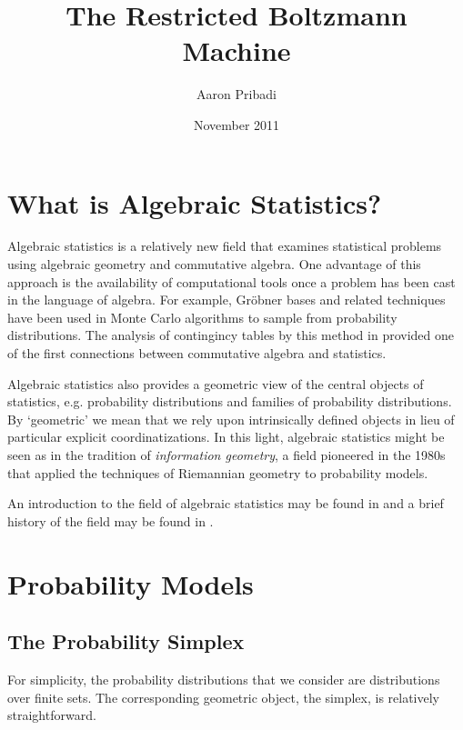 \documentclass[11pt,titlepage]{article}
\title{The Restricted Boltzmann Machine}
\author{Aaron Pribadi}
\date{November 2011}
\begin{document}
\maketitle

\tableofcontents

\pagebreak

\section{What is Algebraic Statistics?}

    Algebraic statistics is a relatively new field that examines statistical
    problems using algebraic geometry and commutative algebra.  One advantage of
    this approach is the availability of computational tools once a problem has
    been cast in the language of algebra.  For example, Gröbner bases and
    related techniques have been used in Monte Carlo algorithms to sample from
    probability distributions.  The analysis of contingincy tables by this
    method in \cite{DS98} provided one of the first connections between
    commutative algebra and statistics.

    Algebraic statistics also provides a geometric view of the central objects
    of statistics, e.g. probability distributions and families of probability
    distributions.  By `geometric' we mean that we rely upon intrinsically
    defined objects in lieu of particular explicit coordinatizations.  In this
    light, algebraic statistics might be seen as in the tradition of
    \emph{information geometry}, a field pioneered in the 1980s that applied the
    techniques of Riemannian geometry to probability models.

    An introduction to the field of algebraic statistics may be found in
    \cite{DSS09} and a brief history of the field may be found in \cite{Ricc09}.


\section{Probability Models}
    \subsection{The Probability Simplex}
    For simplicity, the probability distributions that we consider are
    distributions over finite sets.  The corresponding geometric object, the
    simplex, is relatively straightforward.  
    
\end{document}
